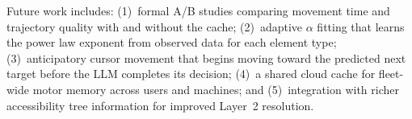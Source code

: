 \documentclass[conference]{IEEEtran}
\begin{document}
Future work includes: (1)~formal A/B studies comparing movement time and trajectory quality with and without the cache; (2)~adaptive $\alpha$ fitting that learns the power law exponent from observed data for each element type; (3)~anticipatory cursor movement that begins moving toward the predicted next target before the LLM completes its decision; (4)~a shared cloud cache for fleet-wide motor memory across users and machines; and (5)~integration with richer accessibility tree information for improved Layer~2 resolution.



\end{document}
